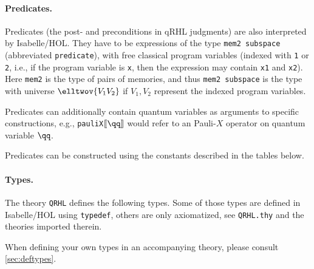 \documentclass{article}
\begin{document}
\paragraph{Predicates.} Predicates (the post- and preconditions in
qRHL judgments) are also interpreted by Isabelle/HOL. They have to be
expressions of the type \texttt{mem2 subspace} (abbreviated \texttt{predicate}),
with free classical
program variables (indexed with \texttt{1} or \texttt{2}, i.e., if the
program variable is \texttt{x}, then the expression may contain
\texttt{x1} and \texttt{x2}). Here \texttt{mem2} is the type of pairs
of memories, and thus \texttt{mem2 subspace} is the type with universe
$\elltwov{V_1V_2}$
if $V_1,V_2$ represent the indexed program variables.

Predicates can additionally contain quantum variables as arguments to
specific constructions, e.g., \texttt{pauliX\guillemotright$\llbracket\qq\rrbracket$}
would refer to an Pauli-$X$ operator on quantum variable $\qq$.

Predicates can be constructed using the constants described in the
tables below.



\paragraph{Types.} The theory \texttt{QRHL} defines the following
types. Some of those types are defined in Isabelle/HOL using
\texttt{typedef}, others are only axiomatized, see
\texttt{QRHL.thy} and the theories imported therein.

When defining your own types in an accompanying theory, please consult \autoref{sec:deftypes}.
\end{document}
